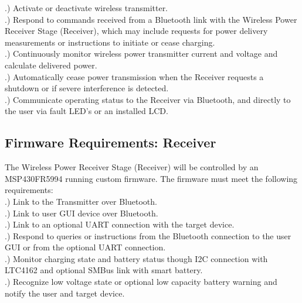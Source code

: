\documentclass[12pt]{article}
\begin{document}
.) Activate or deactivate wireless transmitter.\\

.) Respond to commands received from a Bluetooth link with the Wireless Power Receiver Stage (Receiver), which may include requests for power delivery measurements or instructions to initiate or cease charging.\\

.) Continuously monitor wireless power transmitter current and voltage and calculate delivered power.\\

.) Automatically cease power transmission when the Receiver requests a shutdown or if severe interference is detected.\\

.) Communicate operating status to the Receiver via Bluetooth, and directly to the user via fault LED’s or an installed LCD.


\subsection{Firmware Requirements: Receiver}

\indent \indent
The Wireless Power Receiver Stage (Receiver) will be controlled by an MSP430FR5994 running custom firmware. The firmware must meet the following requirements:\\

.) Link to the Transmitter over Bluetooth.\\

.) Link to user GUI device over Bluetooth.\\

.) Link to an optional UART connection with the target device.\\

.) Respond to queries or instructions from the Bluetooth connection to the user GUI or from the optional UART connection.\\

.) Monitor charging state and battery status though I2C connection with LTC4162 and optional SMBus link with smart battery.\\

.) Recognize low voltage state or optional low capacity battery warning and notify the user and target device.\\
\end{document}
